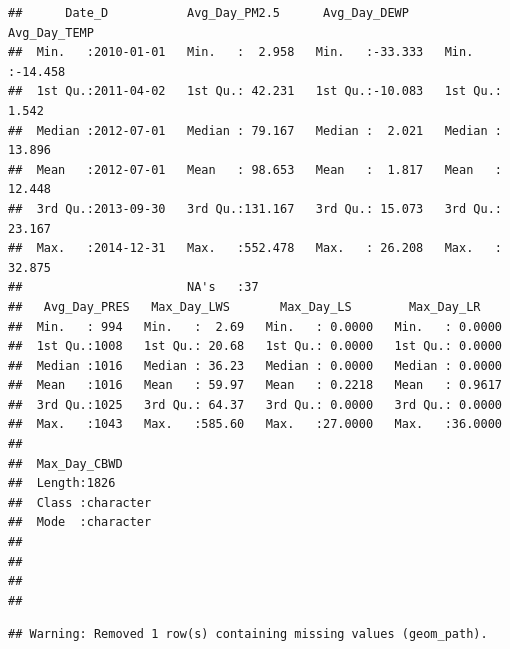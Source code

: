 \documentclass[
]{article}
\begin{document}
\begin{verbatim}
##      Date_D           Avg_Day_PM2.5      Avg_Day_DEWP      Avg_Day_TEMP    
##  Min.   :2010-01-01   Min.   :  2.958   Min.   :-33.333   Min.   :-14.458  
##  1st Qu.:2011-04-02   1st Qu.: 42.231   1st Qu.:-10.083   1st Qu.:  1.542  
##  Median :2012-07-01   Median : 79.167   Median :  2.021   Median : 13.896  
##  Mean   :2012-07-01   Mean   : 98.653   Mean   :  1.817   Mean   : 12.448  
##  3rd Qu.:2013-09-30   3rd Qu.:131.167   3rd Qu.: 15.073   3rd Qu.: 23.167  
##  Max.   :2014-12-31   Max.   :552.478   Max.   : 26.208   Max.   : 32.875  
##                       NA's   :37                                           
##   Avg_Day_PRES   Max_Day_LWS       Max_Day_LS        Max_Day_LR     
##  Min.   : 994   Min.   :  2.69   Min.   : 0.0000   Min.   : 0.0000  
##  1st Qu.:1008   1st Qu.: 20.68   1st Qu.: 0.0000   1st Qu.: 0.0000  
##  Median :1016   Median : 36.23   Median : 0.0000   Median : 0.0000  
##  Mean   :1016   Mean   : 59.97   Mean   : 0.2218   Mean   : 0.9617  
##  3rd Qu.:1025   3rd Qu.: 64.37   3rd Qu.: 0.0000   3rd Qu.: 0.0000  
##  Max.   :1043   Max.   :585.60   Max.   :27.0000   Max.   :36.0000  
##                                                                     
##  Max_Day_CBWD      
##  Length:1826       
##  Class :character  
##  Mode  :character  
##                    
##                    
##                    
## 
\end{verbatim}

\begin{verbatim}
## Warning: Removed 1 row(s) containing missing values (geom_path).
\end{verbatim}
\end{document}

